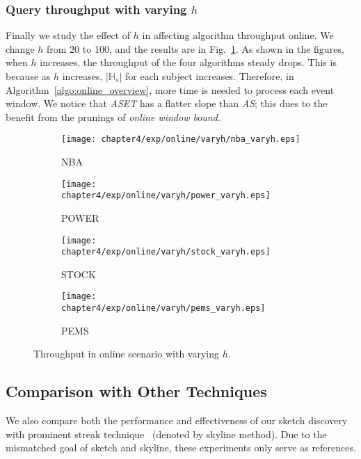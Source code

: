 \subsubsection{Query throughput with varying $h$}
Finally we study the effect of $h$ in affecting algorithm throughput online.
We change $h$ from 20 to 100, and the results are in Fig.~\ref{exp:online_mining_vary_h}.
As shown in the figures, when $h$ increases, 
the throughput of the four algorithms steady drops.
This is because as $h$ increases, $|\mathbb{H}_s|$ for each subject
increases. Therefore, in Algorithm~\ref{algo:online_overview}, more time is needed 
to process each event window. We notice that \emph{ASET} has a flatter slope than \emph{AS}; this
dues to the benefit from the prunings of \emph{online window bound}.
\begin{figure}[t]
\centering
    \begin{subfigure}[b]{0.45\textwidth}
        \texttt{[image: chapter4/exp/online/varyh/nba\_varyh.eps]}
        \caption{NBA}
    \end{subfigure}
    \begin{subfigure}[b]{0.45\textwidth}
        \texttt{[image: chapter4/exp/online/varyh/power\_varyh.eps]}
        \caption{POWER}
    \end{subfigure}
    \begin{subfigure}[b]{0.45\textwidth}
        \texttt{[image: chapter4/exp/online/varyh/stock\_varyh.eps]}
        \caption{STOCK}
    \end{subfigure}
    \begin{subfigure}[b]{0.45\textwidth}
        \texttt{[image: chapter4/exp/online/varyh/pems\_varyh.eps]}
        \caption{PEMS}
    \end{subfigure}
\caption{Throughput in online scenario with varying $h$.}
\label{exp:online_mining_vary_h}
\end{figure}


\subsection{Comparison with Other Techniques}
\label{subsec:exp-survey}
We also compare both the performance and effectiveness of our sketch discovery with prominent streak
technique~\cite{zhang2014discovering} (denoted by skyline method). Due to the mismatched goal of sketch and skyline, these experiments only serve as references.


